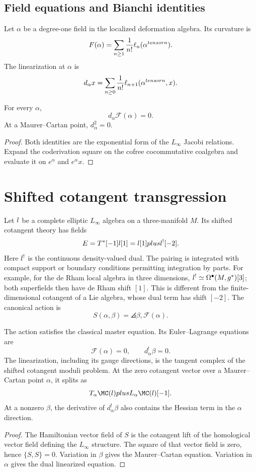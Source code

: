 \subsection{Field equations and Bianchi identities}
Let $\alpha$ be a degree-one field in the localized deformation algebra.  Its curvature is
\[
 F(\alpha)
 =\sum_{n\ge1}\frac1{n!}\ell_n(\alpha^{tensor n}).
\]
The linearization at $\alpha$ is
\[
 d_\alpha x
 =\sum_{n\ge0}\frac1{n!}
   \ell_{n+1}(\alpha^{tensor n},x).
\]

\begin{theorem}
For every $\alpha$,
\[
 d_\alpha\mathcal F(\alpha)=0.
\]
At a Maurer--Cartan point, $d_\alpha^2=0$.
\end{theorem}
\begin{proof}
Both identities are the exponential form of the $L_\infty$ Jacobi relations.  Expand the coderivation square on the cofree cocommutative coalgebra and evaluate it on $e^\alpha$ and $e^\alpha x$.
\end{proof}

\section{Shifted cotangent transgression}
Let $l$ be a complete elliptic $L_\infty$ algebra on a three-manifold $M$.  Its shifted cotangent theory has fields
\[
 E=T^*[-1]l[1]
 =l[1]plusl^![-2].
\]
Here $l^!$ is the continuous density-valued dual. The pairing is
integrated with compact support or boundary conditions permitting integration
by parts. For example, for the de Rham local algebra in three dimensions,
$l^!\simeq\Omega^\bullet(M,g^*)[3]$; both superfields then
have de Rham shift $[1]$. This is different from the finite-dimensional
cotangent of a Lie algebra, whose dual term has shift $[-2]$.
The canonical action is
\[
 S(\alpha,\beta)
 =\angles{\beta,\mathcal F(\alpha)}.
\]

\begin{theorem}
The action satisfies the classical master equation.  Its Euler--Lagrange equations are
\[
 \mathcal F(\alpha)=0,
 \qquad
 d_\alpha^!\beta=0.
\]
The linearization, including its gauge directions, is the tangent complex
of the shifted cotangent moduli problem.
At the zero cotangent vector over a Maurer--Cartan point $\alpha$, it splits
as
\[
 T_\alpha\MC(\flie)\oplus L_\alpha\MC(\flie)[-1].
\]
At a nonzero $\beta$, the derivative of $d_\alpha^!\beta$ also contains
the Hessian term in the $\alpha$ direction.
\end{theorem}
\begin{proof}
The Hamiltonian vector field of $S$ is the cotangent lift of the homological vector field defining the $L_\infty$ structure.  The square of that vector field is zero, hence $\{S,S\}=0$.  Variation in $\beta$ gives the Maurer--Cartan equation.  Variation in $\alpha$ gives the dual linearized equation.
\end{proof}

